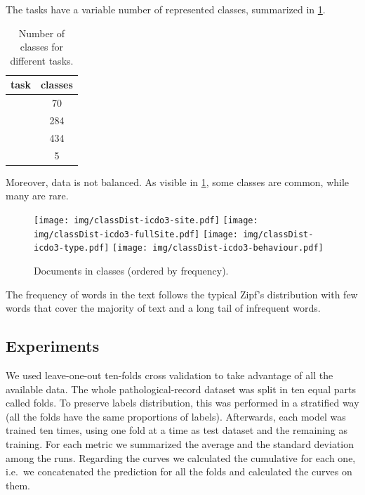 
The tasks have a variable number of represented classes, summarized in
\cref{fig:numClasses}.
\begin{table}
  \center
  \caption{Number of classes for different tasks.}
  \label{fig:numClasses}
  \begin{tabular}{|l|c|}
    \hline
    task & classes \\
    \hline
    \site{} & 70 \\
    \fullSite{} & 284 \\
    \type{} & 434 \\
    \behaviour{} & 5 \\
    \hline
  \end{tabular}
\end{table}
Moreover, data is not balanced. As visible in \cref{fig:classDist},
some classes are common, while many are rare.
\begin{figure}
  \centering
  \texttt{[image: img/classDist-icdo3-site.pdf]}
  \texttt{[image: img/classDist-icdo3-fullSite.pdf]}
  \texttt{[image: img/classDist-icdo3-type.pdf]}
  \texttt{[image: img/classDist-icdo3-behaviour.pdf]}
  \caption{Documents in classes (ordered by
    frequency).}
  \label{fig:classDist}
\end{figure}

The frequency of words in the text
follows the typical Zipf's distribution with few words that cover the
majority of text and a long tail of infrequent words.


\subsection{Experiments}
\label{sec:experiments}
We used leave-one-out ten-folds cross validation
to take advantage of all the available data. The whole
pathological-record dataset was split in ten equal parts called
folds. To preserve labels distribution, this was performed in a
stratified way (all the folds have the same proportions of
labels). Afterwards, each
model was trained ten times, using one fold at a time as test
dataset and the remaining as training. For each metric we summarized the
average and the standard deviation among the runs. Regarding the
curves we calculated the cumulative for each 
one, i.e.\ we concatenated the prediction for all the folds and
calculated the curves on them. 

